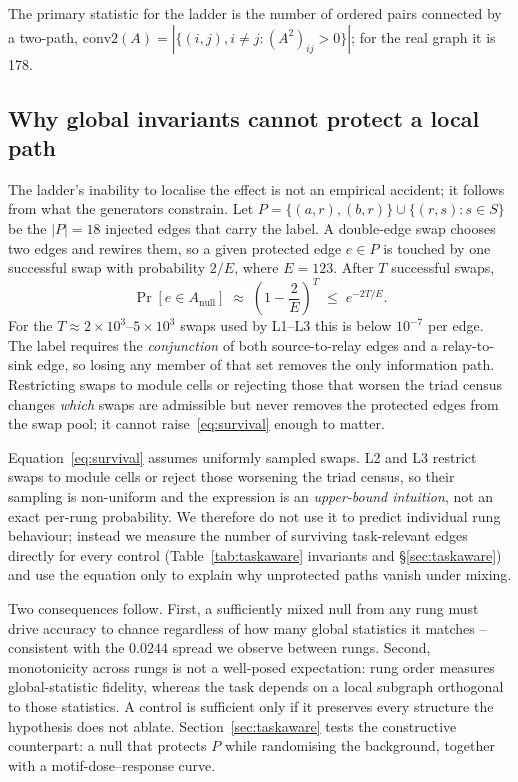 \documentclass[10pt,twocolumn,letterpaper]{article}
\begin{document}
The primary statistic for the ladder is the number of ordered pairs connected
by a two-path, $\mathrm{conv2}(A) = |\{(i,j), i\ne j : (A^2)_{ij}>0\}|$;
for the real graph it is 178.

\subsection{Why global invariants cannot protect a local path}
\label{sec:theory}

The ladder's inability to localise the effect is not an empirical accident;
it follows from what the generators constrain. Let
$P=\{(a,r),(b,r)\}\cup\{(r,s): s\in S\}$ be the $|P|=18$ injected edges that
carry the label. A double-edge swap chooses two edges and rewires them, so a
given protected edge $e\in P$ is touched by one successful swap with
probability $2/E$, where $E=123$. After $T$ successful swaps,
\begin{equation}
\Pr[e\in A_{\text{null}}]\;\approx\;\left(1-\frac{2}{E}\right)^{T}
\;\le\;e^{-2T/E}.
\label{eq:survival}
\end{equation}
For the $T\!\approx\!2\!\times\!10^{3}$--$5\!\times\!10^{3}$ swaps used by
L1--L3 this is below $10^{-7}$ per edge. The label requires the
\emph{conjunction} of both source-to-relay edges and a relay-to-sink edge, so
losing any member of that set removes the only information path. Restricting
swaps to module cells or rejecting those that worsen the triad census changes
\emph{which} swaps are admissible but never removes the protected edges from
the swap pool; it cannot raise~\eqref{eq:survival} enough to matter.

Equation~\eqref{eq:survival} assumes uniformly sampled swaps. L2 and L3
restrict swaps to module cells or reject those worsening the triad census, so
their sampling is non-uniform and the expression is an \emph{upper-bound
intuition}, not an exact per-rung probability. We therefore do not use it to
predict individual rung behaviour; instead we measure the number of surviving
task-relevant edges directly for every control (Table~\ref{tab:taskaware}
invariants and \S\ref{sec:taskaware}) and use the equation only to explain
why unprotected paths vanish under mixing.

Two consequences follow. First, a sufficiently mixed null from any rung must
drive accuracy to chance regardless of how many global statistics it matches
-- consistent with the $0.0244$ spread we observe between rungs. Second,
monotonicity across rungs is not a well-posed expectation: rung order
measures global-statistic fidelity, whereas the task depends on a local
subgraph orthogonal to those statistics. A control is sufficient only if it
preserves every structure the hypothesis does not ablate. Section~\ref{sec:taskaware}
tests the constructive counterpart: a null that protects $P$ while randomising
the background, together with a motif-dose--response curve.
\end{document}

